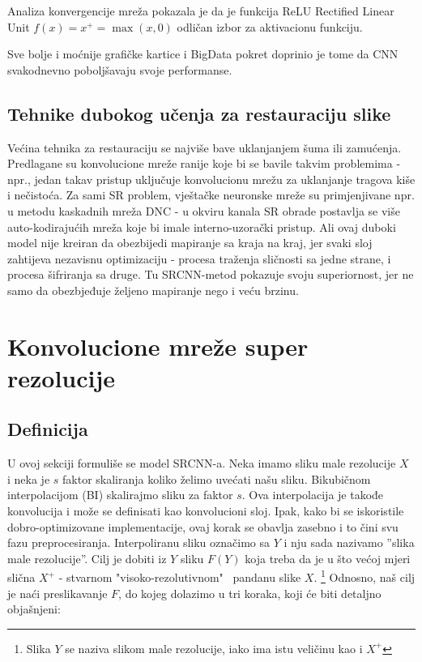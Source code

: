 \documentclass[12pt]{report}
\numberwithin{equation}{section}
\begin{document}
\newpage  
  
  Analiza konvergencije mreža pokazala je da je funkcija ReLU Rectified Linear Unit $f(x)=x^{+}=\max(x,0)$ odličan izbor za aktivacionu funkciju.
  
   
 
Sve bolje i moćnije grafičke kartice i BigData pokret doprinio je tome da CNN svakodnevno poboljšavaju svoje performanse.  


\section{Tehnike dubokog učenja za restauraciju slike}

Većina tehnika za restauraciju se najviše bave uklanjanjem šuma ili zamućenja. Predlagane su konvolucione mreže ranije koje bi se bavile takvim problemima - npr., jedan takav pristup uključuje konvolucionu mrežu za uklanjanje tragova kiše i nečistoća. Za sami SR problem, vještačke neuronske mreže su primjenjivane npr. u metodu kaskadnih mreža DNC -  u okviru kanala SR obrade postavlja se više auto-kodirajućih mreža koje bi imale interno-uzorački pristup. Ali ovaj duboki model nije kreiran da obezbijedi  mapiranje sa kraja na kraj, jer svaki sloj zahtijeva nezavisnu optimizaciju - procesa traženja sličnosti sa jedne strane, i procesa šifriranja sa druge. Tu SRCNN-metod pokazuje svoju superiornost, jer ne samo da obezbjeđuje željeno mapiranje nego i veću brzinu.
  
  
\chapter{Konvolucione mreže super rezolucije}\label{ch3}

\section{Definicija}\label{ch2}

U ovoj sekciji formuliše se model SRCNN-a. Neka imamo sliku male rezolucije $X$ i neka je $s$ faktor skaliranja koliko želimo uvećati našu sliku. Bikubičnom interpolacijom (BI) skalirajmo sliku za faktor $s$. Ova interpolacija je takođe konvolucija i može se definisati kao konvolucioni sloj. Ipak, kako bi se iskoristile dobro-optimizovane implementacije, ovaj korak se obavlja zasebno i to čini svu fazu preprocesiranja. Interpoliranu sliku označimo sa $Y$ i nju sada nazivamo ''slika male rezolucije''. Cilj je dobiti iz $Y$ sliku $F(Y)$ koja treba da je u što većoj mjeri slična $X^{+}$ - stvarnom "visoko-rezolutivnom"  \ pandanu slike $X$. \footnote{Slika $Y$ se naziva slikom male rezolucije, iako ima istu veličinu kao i $X^{+}$} Odnosno, naš cilj je naći preslikavanje $F$, do kojeg dolazimo u tri koraka, koji će biti detaljno objašnjeni:
\end{document}
